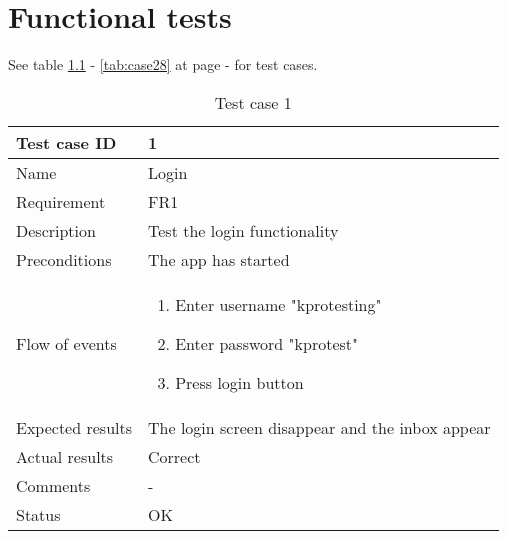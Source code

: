 \chapter{Functional tests}\label{ch:funtest}
		See table \ref{tab:case1} - \ref{tab:case28} at page \pageref{tab:case1} - \pageref{tab:case28} for test cases.
		\begin{table}[h!]
			\begin{tabular}{l|p{10cm}}
				Test case ID & 1 \\ \hline
				Name & Login\\ \hline
				Requirement & FR1\\ \hline
				Description & Test the login functionality\\ \hline
				Preconditions & The app has started\\ \hline
				Flow of events & 
					\begin{enumerate}
						\item{}Enter username "kprotesting"
						\item{}Enter password "kprotest"
						\item{}Press login button
					\end{enumerate} \\ \hline
				Expected results & The login screen disappear and the inbox appear\\ \hline
				Actual results & Correct\\ \hline
				Comments & -\\ \hline
				Status & OK\\ \hline
			\end{tabular}
			\caption{Test case 1} \label{tab:case1}
		\end{table}

